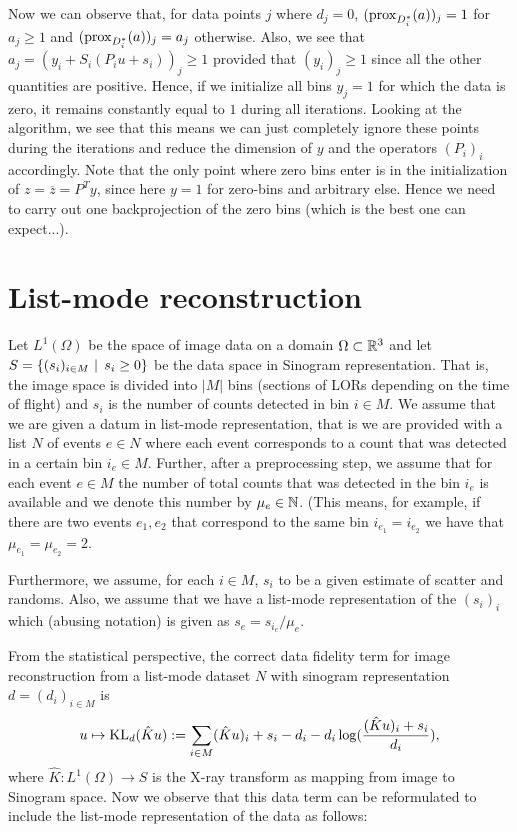 \documentclass{article}
\begin{document}
Now we can observe that, for data points $j$ where $d_j = 0$, $(\operatorname{prox}_{D_i^*}(a))_j = 1$ for $a_j \geq 1$ and $(\operatorname{prox}_{D_i^*}(a))_j = a_j$ otherwise. Also, we see that $ a_j = (y_i + S_i (P_iu + s_i) )_j \geq 1$ provided that $(y_i)_j \geq 1$ since all the other quantities are positive. Hence, if we initialize all bins $y_j = 1$ for which the data is zero, it remains constantly equal to $1$ during all iterations. Looking at the algorithm, we see that this means we can just completely ignore these points during the iterations and reduce the dimension of $y$ and the operators $(P_i)_i$ accordingly. Note that the only point where zero bins enter is in the initialization of $z = \overline{z} = P^Ty$, since here $y = 1$ for zero-bins and arbitrary else. Hence we need to carry out one backprojection of the zero bins (which is the best one can expect...).

\section{List-mode reconstruction}

Let $L^1(\Omega)$ be the space of image data on a domain $\Omega \subset \mathbb{R}^3$ and let $S = \{ (s_i)_{i \in M} \, \left|\right.\, s_i \geq 0 \}$ be the data space in Sinogram representation. That is, the image space is divided into $|M|$ bins (sections of LORs depending on the time of flight) and $s_i$ is the number of counts detected in bin $i \in M$. We assume that we are given a datum in list-mode representation, that is we are provided with a list $N$ of events $e \in N $ where each event corresponds to a count that was detected in a certain bin $i_e \in M$. Further, after a preprocessing step, we assume that for each event $e \in M$ the number of total counts that was detected in the bin $i_e$ is available and we denote this number by $\mu_e \in \mathbb{N}$. (This means, for example, if there are two events $e_1,e_2$ that correspond to the same bin $i_{e_1} = i_{e_2}$ we have that $\mu_{e_1} = \mu_{e_2} = 2$. 

Furthermore, we assume, for each $i \in M$, $s_i$ to be a given estimate of scatter and randoms. Also, we assume that we have a list-mode representation of the $(s_i)_i$ which (abusing notation) is given as $s_e = s_{i_e}/\mu_e$. 


From the statistical perspective, the correct data fidelity term for image reconstruction from a list-mode dataset $N$ with sinogram representation $d= (d_i)_{ i \in M}$ is 
\[ u \mapsto \operatorname{KL}_d(\hat{K}u):=  \sum_{i \in M} (\hat{K}u)_i + s_i  - d_i -d_i \log(\frac{(\hat{K}u)_i + s_i}{d_i} ) ,\]
where $\hat{K}:L^1(\Omega) \rightarrow S$ is the X-ray transform as mapping from image to Sinogram space. Now we observe that this data term can be reformulated to include the list-mode representation of the data as follows:
\end{document}
